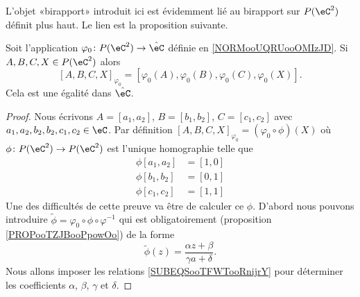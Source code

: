 L'objet «birapport» introduit ici est évidemment lié au birapport sur \( P(\eC^2)\) définit plus haut. Le lien est la proposition suivante.

\begin{proposition}     \label{PROPooLKQQooEOrjwC}
    Soit l'application \( \varphi_0\colon P(\eC^2)\to \hat\eC\) définie en \ref{NORMooUQRUooOMIzJD}. Si \( A,B,C,X\in P(\eC^2) \) alors
    \begin{equation}        \label{EQooEOZZooMRHJfH}
        [A,B,C,X]_{\varphi_0}=[\varphi_0(A),\varphi_0(B),\varphi_0(C),\varphi_0(X)].
    \end{equation}
    Cela est une égalité dans \( \hat \eC\).
\end{proposition}

\begin{proof}
    Nous écrivons \( A=[a_1,a_2]\), \( B=[b_1,b_2]\), \( C=[c_1,c_2]\) avec \( a_1,a_2,b_2,b_2,c_1,c_2\in \eC\). Par définition \( [A,B,C,X]_{\varphi_0}=(\varphi_0\circ\phi)(X)\) où \( \phi\colon P(\eC^2)\to P(\eC^2)\) est l'unique homographie telle que
    \begin{subequations}        \label{SUBEQSooTFWTooRnijrY}
        \begin{align}
            \phi[a_1,a_2]&=[1,0]\\
            \phi[b_1,b_2]&=[0,1]\\
            \phi[c_1,c_2]&=[1,1]
        \end{align}
    \end{subequations}
    Une des difficultés de cette preuve va être de calculer ce \( \phi\). D'abord nous pouvons introduire \( \tilde \phi=\varphi_0\circ\phi\circ\varphi^{-1}\) qui est obligatoirement (proposition \ref{PROPooTZJBooPpowOo}) de la forme
    \begin{equation}
        \tilde \phi(z)=\frac{ \alpha z+\beta }{ \gamma a+\delta }.
    \end{equation}
    Nous allons imposer les relations \eqref{SUBEQSooTFWTooRnijrY} pour déterminer les coefficients \( \alpha\), \( \beta\), \( \gamma\) et \( \delta\).


\end{proof}
